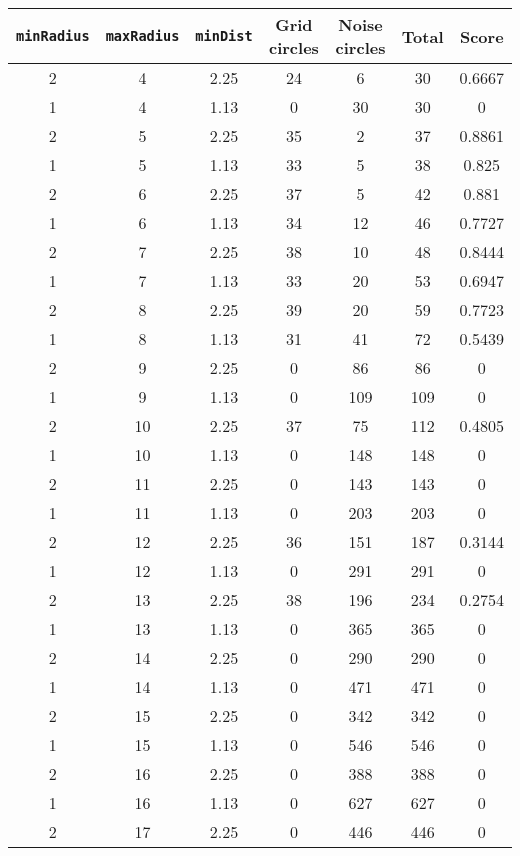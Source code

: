 \documentclass[letterpaper, 12pt]{article}
\begin{document}
\begin{longtable}{|c|c|c|c|c|c|c|}
\hline
\textbf{\texttt{minRadius}} & \textbf{\texttt{maxRadius}} & \textbf{\texttt{minDist}} & \textbf{Grid circles} & \textbf{Noise circles} & \textbf{Total} & \textbf{Score} \\
\hline
2 & 4 & 2.25 & 24 & 6 & 30 & 0.6667 \\
\hline
1 & 4 & 1.13 & 0 & 30 & 30 & 0 \\
\hline
2 & 5 & 2.25 & 35 & 2 & 37 & 0.8861 \\
\hline
1 & 5 & 1.13 & 33 & 5 & 38 & 0.825 \\
\hline
2 & 6 & 2.25 & 37 & 5 & 42 & 0.881 \\
\hline
1 & 6 & 1.13 & 34 & 12 & 46 & 0.7727 \\
\hline
2 & 7 & 2.25 & 38 & 10 & 48 & 0.8444 \\
\hline
1 & 7 & 1.13 & 33 & 20 & 53 & 0.6947 \\
\hline
2 & 8 & 2.25 & 39 & 20 & 59 & 0.7723 \\
\hline
1 & 8 & 1.13 & 31 & 41 & 72 & 0.5439 \\
\hline
2 & 9 & 2.25 & 0 & 86 & 86 & 0 \\
\hline
1 & 9 & 1.13 & 0 & 109 & 109 & 0 \\
\hline
2 & 10 & 2.25 & 37 & 75 & 112 & 0.4805 \\
\hline
1 & 10 & 1.13 & 0 & 148 & 148 & 0 \\
\hline
2 & 11 & 2.25 & 0 & 143 & 143 & 0 \\
\hline
1 & 11 & 1.13 & 0 & 203 & 203 & 0 \\
\hline
2 & 12 & 2.25 & 36 & 151 & 187 & 0.3144 \\
\hline
1 & 12 & 1.13 & 0 & 291 & 291 & 0 \\
\hline
2 & 13 & 2.25 & 38 & 196 & 234 & 0.2754 \\
\hline
1 & 13 & 1.13 & 0 & 365 & 365 & 0 \\
\hline
2 & 14 & 2.25 & 0 & 290 & 290 & 0 \\
\hline
1 & 14 & 1.13 & 0 & 471 & 471 & 0 \\
\hline
2 & 15 & 2.25 & 0 & 342 & 342 & 0 \\
\hline
1 & 15 & 1.13 & 0 & 546 & 546 & 0 \\
\hline
2 & 16 & 2.25 & 0 & 388 & 388 & 0 \\
\hline
1 & 16 & 1.13 & 0 & 627 & 627 & 0 \\
\hline
2 & 17 & 2.25 & 0 & 446 & 446 & 0 \\
\hline

\end{longtable}
\end{document}
